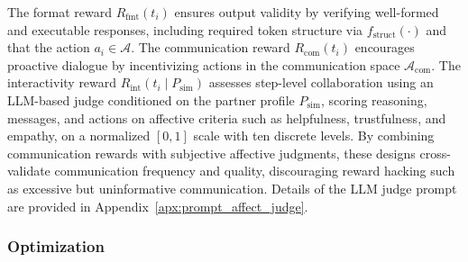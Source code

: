 \documentclass{article}
\theoremstyle{plain}
\theoremstyle{definition}
\theoremstyle{remark}
\begin{document}
The format reward $R_{\text{fmt}}(t_i)$ ensures output validity by verifying well-formed and executable responses, including required token structure via $f_{\text{struct}}(\cdot)$ and that the action $a_i \in \mathcal{A}$. The communication reward $R_{\text{com}}(t_i)$ encourages proactive dialogue by incentivizing actions in the communication space $\mathcal{A}_{\text{com}}$. The interactivity reward $R_{\text{int}}(t_i \mid P_{\text{sim}})$ assesses step-level collaboration using an LLM-based judge conditioned on the partner profile $P_{\text{sim}}$, scoring reasoning, messages, and actions on affective criteria such as helpfulness, trustfulness, and empathy, on a normalized $[0,1]$ scale with ten discrete levels. By combining communication rewards with subjective affective judgments, these designs cross-validate communication frequency and quality, discouraging reward hacking such as excessive but uninformative communication. Details of the LLM judge prompt are provided in Appendix~\ref{apx:prompt_affect_judge}.





\subsubsection{Optimization}
\end{document}
